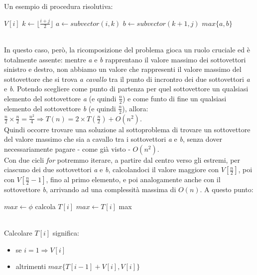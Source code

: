 Un esempio di procedura risolutiva:
\begin{algorithm}
	\label{alg:subDIV1}
	\begin{algorithmic}
				\State \Return $V[i]$
			\EndIf
			\State $k \gets \lfloor\frac{i+j}{2}\rfloor$
			\State $a \gets subvector(i,k)$
			\State $b \gets subvector(k+1,j)$
			\State \Return $max\{a,b\}$
		\EndFunction
	\end{algorithmic}
\end{algorithm} \hfill \\
In questo caso, però, la ricomposizione del problema gioca un ruolo cruciale ed è totalmente assente: mentre \textit{a} e \textit{b} rapprentano il valore massimo dei sottovettori sinistro e destro, non abbiamo un valore che rappresenti il valore massimo del sottovettore che si trova \textit{a cavallo} tra il punto di incrontro dei due sottovettori \textit{a} e \textit{b}. Potendo scegliere come punto di partenza per quel sottovettore un qualsiasi elemento del sottovettore \textit{a} (e quindi $\frac{n}{2}$) e come funto di fine un qualsiasi elemento del sottovettore \textit{b} (e quindi $\frac{n}{2}$), allora: $\frac{n}{2} \times \frac{n}{2} = \frac{n^2}{4} \Rightarrow T(n) = 2\times T(\frac{n}{2}) + O(n^2)$. \\
Quindi occorre trovare una soluzione al sottoproblema di trovare un sottovettore del valore massimo che sia a cavallo tra i sottovettori \textit{a} e \textit{b}, senza dover necessariamente pagare - come già visto - $O(n^2)$. \\
Con due cicli \textit{for} potremmo iterare, a partire dal centro verso gli estremi, per ciascuno dei due sottovettori \textit{a} e \textit{b}, calcolandoci il valore maggiore con $V[\frac{n}{2}]$, poi con $V[\frac{n}{2}-1]$, fino al primo elemento, e poi analogamente anche con il sottovettore \textit{b}, arrivando ad una complessità massima di $O(n)$.
A questo punto:
\begin{algorithm}
	\label{alg:subDIV2}
	\begin{algorithmic}
		\Function{subvectorV3}{V,n}
			\State $max \gets \phi$
			\For { $i \gets 1$ to $n$ }
				\State calcola $T[i]$
				\If { $T[i] > max$ }
					\State $max \gets T[i]$
				\EndIf
			\EndFor
			\State \Return max
		\EndFunction
	\end{algorithmic}
\end{algorithm} \hfill \\
Calcolare $T[i]$ significa:
\begin{itemize}
	\item se $i=1 \Rightarrow V[i]$
	\item altrimenti $max\{T[i-1]+V[i], V[i]\}$
\end{itemize}
